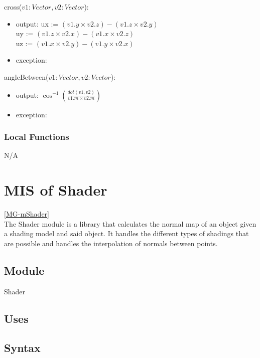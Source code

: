 \documentclass[12pt, titlepage]{article}
\begin{document}
\noindent cross($v1:Vector, v2:Vector$):
\begin{itemize}
	\item output: 
	ux := $(v1.y \times v2.z) - (v1.z \times v2.y)$  \\
	uy := $(v1.z \times v2.x) - (v1.x \times v2.z)$  \\
	uz := $(v1.x \times v2.y) - (v1.y \times v2.x)$  \\
	\item exception: \\
\end{itemize}

\noindent angleBetween($v1:Vector, v2:Vector$):
\begin{itemize}
	\item output: $\cos^{-1}(\frac{dot(v1, v2)}{v1.m \times v2.m})$
	\item exception: \\
\end{itemize}

\subsubsection{Local Functions}
N/A

\newpage

\section{MIS of Shader} \ref{MG-mShader} \\
The Shader module is a library that calculates the normal map of an object 
given a shading model and said object. It handles the different types of 
shadings that are possible and handles the interpolation of normals between 
points.

\subsection{Module}
Shader

\subsection{Uses}

\subsection{Syntax}
\end{document}
